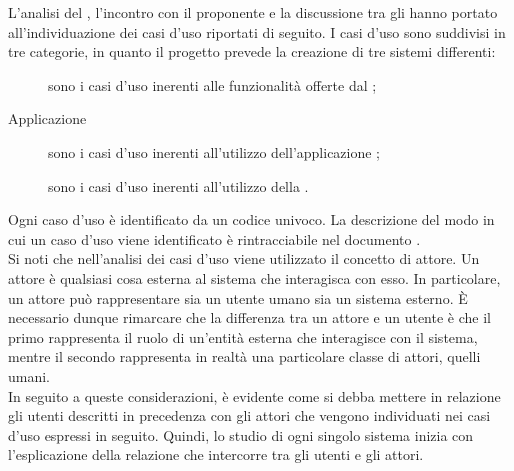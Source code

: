 L’analisi del , l’incontro con il proponente e la discussione tra gli  hanno portato all'individuazione dei casi d'uso riportati di seguito. 
I casi d'uso sono suddivisi in tre categorie, in quanto il progetto prevede la creazione di tre sistemi differenti:
\begin{description}
	\item[] sono i casi d'uso inerenti alle funzionalità offerte dal ;
	\item[Applicazione ] sono i casi d'uso inerenti all'utilizzo dell'applicazione ;
	\item[] sono i casi d'uso inerenti all'utilizzo della .
\end{description}
Ogni caso d'uso è identificato da un codice univoco. La descrizione del modo in cui un caso d'uso viene identificato è rintracciabile nel documento .\\
Si noti che nell'analisi dei casi d'uso viene utilizzato il concetto di attore. Un attore è qualsiasi cosa esterna al sistema che interagisca con esso. In particolare, un attore può rappresentare sia un utente umano sia un sistema esterno. È necessario dunque rimarcare che la differenza tra un attore e un utente è che il primo rappresenta il ruolo di un'entità esterna che interagisce con il sistema, mentre il secondo rappresenta in realtà una particolare classe di attori, quelli umani.\\
In seguito a queste considerazioni, è evidente come si debba mettere in relazione gli utenti descritti in precedenza con gli attori che vengono individuati nei casi d'uso espressi in seguito. Quindi, lo studio di ogni singolo sistema inizia con l'esplicazione della relazione che intercorre tra gli utenti e gli attori.


